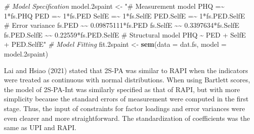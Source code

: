 \documentclass[
  man]{apa7}
\newenvironment{Shaded}{\begin{snugshade}}{\end{snugshade}}
\newcommand{\AttributeTok}[1]{\textcolor[rgb]{0.13,0.29,0.53}{#1}}
\newcommand{\CommentTok}[1]{\textcolor[rgb]{0.56,0.35,0.01}{\textit{#1}}}
\newcommand{\FloatTok}[1]{\textcolor[rgb]{0.00,0.00,0.81}{#1}}
\newcommand{\FunctionTok}[1]{\textcolor[rgb]{0.13,0.29,0.53}{\textbf{#1}}}
\newcommand{\NormalTok}[1]{#1}
\newcommand{\OtherTok}[1]{\textcolor[rgb]{0.56,0.35,0.01}{#1}}
\newcommand{\StringTok}[1]{\textcolor[rgb]{0.31,0.60,0.02}{#1}}
\begin{document}
\begin{Shaded}
\begin{Highlighting}[]
\CommentTok{\# Model Specification}
\NormalTok{model}\FloatTok{.2}\NormalTok{spaint }\OtherTok{\textless{}{-}} \StringTok{"\# Measurement model}
\StringTok{                    PHQ =\textasciitilde{} 1*fs.PHQ}
\StringTok{                    PED =\textasciitilde{} 1*fs.PED}
\StringTok{                    SelfE =\textasciitilde{} 1*fs.SelfE}
\StringTok{                    PED.SelfE =\textasciitilde{} 1*fs.PED.SelfE}
\StringTok{                  \# Error variance}
\StringTok{                    fs.PED \textasciitilde{}\textasciitilde{} 0.09875111*fs.PED}
\StringTok{                    fs.SelfE \textasciitilde{}\textasciitilde{} 0.3397634*fs.SelfE}
\StringTok{                    fs.PED.SelfE \textasciitilde{}\textasciitilde{} 0.22559*fs.PED.SelfE}
\StringTok{                  \# Structural model}
\StringTok{                    PHQ \textasciitilde{} PED + SelfE + PED.SelfE"}
\CommentTok{\# Model Fitting}
\NormalTok{fit}\FloatTok{.2}\NormalTok{spaint }\OtherTok{\textless{}{-}} \FunctionTok{sem}\NormalTok{(}\AttributeTok{data =}\NormalTok{ dat.fs, }\AttributeTok{model =}\NormalTok{ model}\FloatTok{.2}\NormalTok{spaint)}
\end{Highlighting}
\end{Shaded}

\normalsize
Lai and Hsiao (2021) stated that 2S-PA was similar to RAPI when the indicators were treated as continuous with normal distributions. When using Bartlett scores, the model of 2S-PA-Int was similarly specified as that of RAPI, but with more simplicity because the standard errors of measurement were computed in the first stage. Thus, the input of constraints for factor loadings and error variances were even clearer and more straightforward. The standardization of coefficients was the same as UPI and RAPI.
\end{document}
